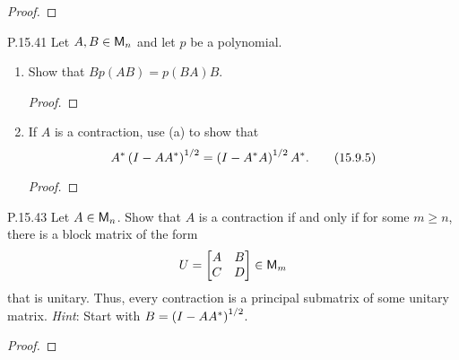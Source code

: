 \documentclass{../homework}
\begin{document}
\begin{problems}
  \begin{solution}
    \begin{proof}

    \end{proof}
  \end{solution}

\item[P.15.41] Let \(A, B \in \mathsf{M}_n\) and let \(p\) be a polynomial.
  \begin{enumerate}
  \item Show that \(B p(AB) = p(BA) B\).

    \begin{solution}
      \begin{proof}

      \end{proof}
    \end{solution}

  \item If \(A\) is a contraction, use (a) to show that
    \[
      A^* \left( {I-AA^*} \right)^{1/2} = \left( {I-A^* A} \right)^{1/2} A^*.
      \tag{15.9.5}
    \]

    \begin{solution}
      \begin{proof}

      \end{proof}
    \end{solution}
  \end{enumerate}

\item[P.15.43] Let \(A \in \mathsf{M}_n\).  Show that \(A\) is a contraction
  if and only if for some \(m \ge n\), there is a block matrix of the
  form
  \[
    U = \begin{bmatrix} A & B \\ C & D \end{bmatrix} \in \mathsf{M}_m
  \]
  that is unitary.  Thus, every contraction is a principal submatrix
  of some unitary matrix.  \textit{Hint}: Start with
  \(B = \left( {I - AA^*} \right)^{1/2}\).

  \begin{solution}
    \begin{proof}

    \end{proof}
  \end{solution}
\end{problems}
\end{document}
